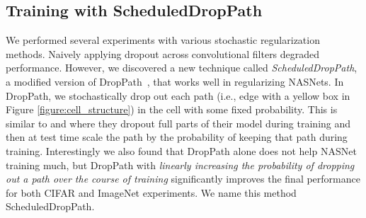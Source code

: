 


\subsection{Training with ScheduledDropPath}
We performed several experiments with various stochastic regularization methods. Naively applying dropout \cite{srivastava2014dropout} across convolutional filters degraded performance. However,  we discovered a new technique called \emph{ScheduledDropPath}, a modified version of DropPath~\cite{larsson2016fractalnet}, that works well in regularizing NASNets. In DropPath, we stochastically drop out each path (i.e., edge with a yellow box in Figure \ref{figure:cell_structure}) in the cell with some fixed probability. This is similar to \cite{stochastic} and \cite{zhang2016polynet} where they dropout full parts of their model during training and then at test time scale the path by the probability of keeping that path during training. Interestingly we also found that DropPath alone does not help NASNet training much, but DropPath with \emph{linearly increasing the probability of dropping out a path over the course of training}  significantly improves the final performance for both CIFAR and ImageNet experiments. We name this method ScheduledDropPath.

